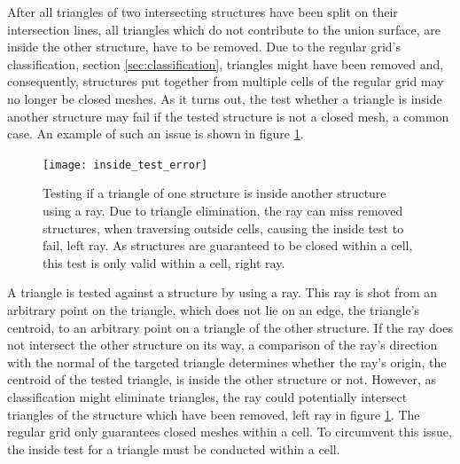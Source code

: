 After all triangles of two intersecting structures have been split on their intersection lines, all triangles which do not contribute to the union surface, \ie are inside the other structure, have to be removed.
Due to the regular grid's classification, \cf section \ref{sec:classification}, triangles might have been removed and, consequently, structures put together from multiple cells of the regular grid may no longer be closed meshes.
As it turns out, the test whether a triangle is inside another structure may fail if the tested structure is not a closed mesh, a common case.
An example of such an issue is shown in figure \ref{fig:inside_test_error}.
%
\begin{figure}
	\centering
	\texttt{[image: inside\_test\_error]}
	\caption{
		Testing if a triangle of one structure is inside another structure using a ray.
		Due to triangle elimination, the ray can miss removed structures, \eg when traversing outside cells, causing the inside test to fail, \cf left ray.
		As structures are guaranteed to be closed within a cell, this test is only valid within a cell, \cf right ray.
	}
	\label{fig:inside_test_error}
\end{figure}
%
A triangle is tested against a structure by using a ray.
This ray is shot from an arbitrary point on the triangle, which does not lie on an edge, \eg the triangle's centroid, to an arbitrary point on a triangle of the other structure.
If the ray does not intersect the other structure on its way, a comparison of the ray's direction with the normal of the targeted triangle determines whether the ray's origin, \ie the centroid of the tested triangle, is inside the other structure or not.
However, as classification might eliminate triangles, the ray could potentially intersect triangles of the structure which have been removed, \cf left ray in figure \ref{fig:inside_test_error}.
The regular grid only guarantees closed meshes within a cell.
To circumvent this issue, the inside test for a triangle must be conducted within a cell.

